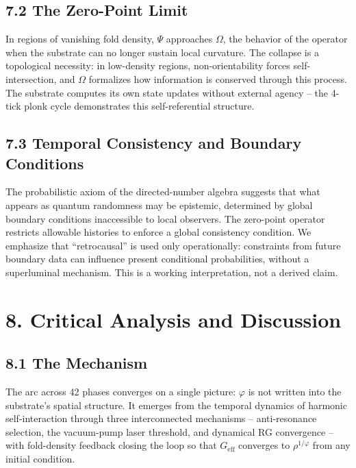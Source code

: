 \documentclass[
  11pt,
]{article}
\begin{document}
\subsection{7.2 The Zero-Point Limit}\label{the-zero-point-limit}

In regions of vanishing fold density, \(\Psi\) approaches \(\Omega\),
the behavior of the operator when the substrate can no longer sustain
local curvature. The collapse is a topological necessity: in low-density
regions, non-orientability forces self-intersection, and \(\Omega\)
formalizes how information is conserved through this process. The
substrate computes its own state updates without external agency -- the
4-tick plonk cycle demonstrates this self-referential structure.

\subsection{7.3 Temporal Consistency and Boundary
Conditions}\label{temporal-consistency-and-boundary-conditions}

The probabilistic axiom of the directed-number algebra suggests that
what appears as quantum randomness may be epistemic, determined by
global boundary conditions inaccessible to local observers. The
zero-point operator restricts allowable histories to enforce a global
consistency condition. We emphasize that ``retrocausal'' is used only
operationally: constraints from future boundary data can influence
present conditional probabilities, without a superluminal mechanism.
This is a working interpretation, not a derived claim.

\section{8. Critical Analysis and
Discussion}\label{critical-analysis-and-discussion}

\subsection{8.1 The Mechanism}\label{the-mechanism}

The arc across 42 phases converges on a single picture: \(\varphi\) is
not written into the substrate's spatial structure. It emerges from the
temporal dynamics of harmonic self-interaction through three
interconnected mechanisms -- anti-resonance selection, the vacuum-pump
laser threshold, and dynamical RG convergence -- with fold-density
feedback closing the loop so that \(G_{\text{eff}}\) converges to
\(\rho^{1/\varphi}\) from any initial condition.
\end{document}
